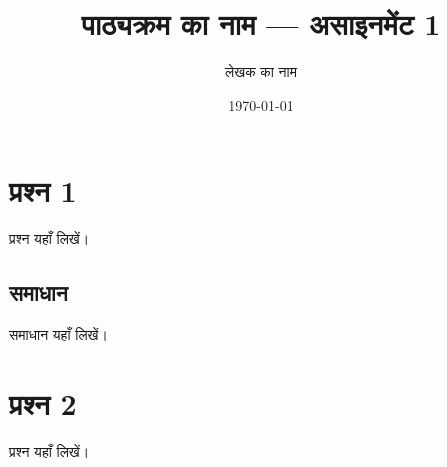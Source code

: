 \documentclass[11pt]{article}
\title{पाठ्यक्रम का नाम — असाइनमेंट 1}
\author{लेखक का नाम}
\date{\today}
\begin{document}
\maketitle

\section*{प्रश्न 1}
प्रश्न यहाँ लिखें।

\subsection*{समाधान}
समाधान यहाँ लिखें।

\section*{प्रश्न 2}
प्रश्न यहाँ लिखें।
\end{document}
